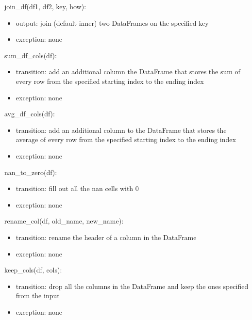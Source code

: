 \documentclass[12pt]{article}
\begin{document}
\noindent join\_df(df1, df2, key, how):
\begin{itemize}
    \item output: join (default inner) two DataFrames on the specified key 
    \item exception: none
\end{itemize}

\noindent sum\_df\_cols(df):
\begin{itemize}
    \item transition: add an additional column the DataFrame that stores the sum of 
    every row from the specified starting index to the ending index
    \item exception: none
\end{itemize}

\noindent avg\_df\_cols(df):
\begin{itemize}
    \item transition: add an additional column to the DataFrame that stores the average of 
    every row from the specified starting index to the ending index
    \item exception: none
\end{itemize}

\noindent nan\_to\_zero(df):
\begin{itemize}
    \item transition: fill out all the nan cells  with $0$
    \item exception: none
\end{itemize}

\noindent rename\_col(df, old\_name, new\_name):
\begin{itemize}
    \item transition: rename the header of a column in the DataFrame
    \item exception: none
\end{itemize}

\noindent keep\_cols(df, cols):
\begin{itemize}
    \item transition: drop all the columns in the DataFrame and keep the ones specified from the input
    \item exception: none
\end{itemize}

\end{document}
